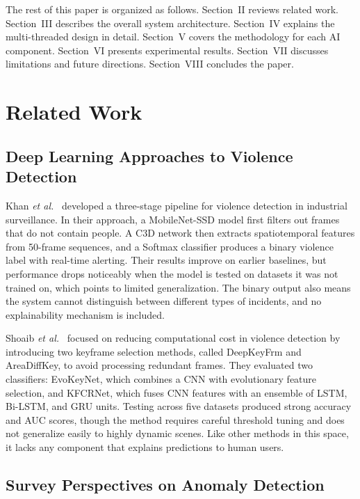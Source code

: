 \documentclass[conference]{IEEEtran}
\begin{document}
The rest of this paper is organized as follows. Section~II reviews related
work. Section~III describes the overall system architecture. Section~IV
explains the multi-threaded design in detail. Section~V covers the
methodology for each AI component. Section~VI presents experimental
results. Section~VII discusses limitations and future directions.
Section~VIII concludes the paper.

\section{Related Work}

\subsection{Deep Learning Approaches to Violence Detection}

Khan \textit{et al.}~\cite{khan2025} developed a three-stage pipeline for
violence detection in industrial surveillance. In their approach, a
MobileNet-SSD model first filters out frames that do not contain people.
A C3D network then extracts spatiotemporal features from 50-frame
sequences, and a Softmax classifier produces a binary violence label with
real-time alerting. Their results improve on earlier baselines, but
performance drops noticeably when the model is tested on datasets it was
not trained on, which points to limited generalization. The binary output
also means the system cannot distinguish between different types of
incidents, and no explainability mechanism is included.

Shoaib \textit{et al.}~\cite{shoaib2023} focused on reducing computational
cost in violence detection by introducing two keyframe selection methods,
called DeepKeyFrm and AreaDiffKey, to avoid processing redundant frames.
They evaluated two classifiers: EvoKeyNet, which combines a CNN with
evolutionary feature selection, and KFCRNet, which fuses CNN features with
an ensemble of LSTM, Bi-LSTM, and GRU units. Testing across five datasets
produced strong accuracy and AUC scores, though the method requires
careful threshold tuning and does not generalize easily to highly dynamic
scenes. Like other methods in this space, it lacks any component that
explains predictions to human users.

\subsection{Survey Perspectives on Anomaly Detection}
\end{document}

